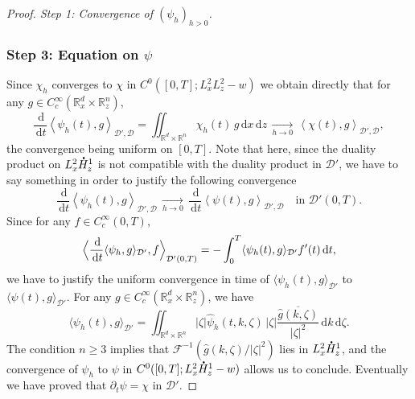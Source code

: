 \documentclass[JEP,XML,SOM,NoEqCountersInSection,NoFloatCountersInSection,Unicode,published]{cedram}
\let\hat\oldhat
\theoremstyle{definition}
\newcommand*{\overbigdot}[1]{%
\accentset{\mbox{\large\bfseries .}}{#1}}
\let\hat\widehat
\newcommand{\R}{\mathbb{R}}
\newcommand{\ud}{\, {\mathrm{d}}}
\begin{document}
\begin{proof}[Proof. Step 1: Convergence of $(\psi_{h})_{h>0}$]
\subsubsection*{Step 3: Equation on $\psi$} Since $\chi_{h}$ converges to $\chi$ in $C^{0}([0,T];L_{x}^{2}L_{z}^{2}-w)$ we obtain directly that for any $g\in C_{c}^{\infty}(\R_{x}^{d}\times\R_{z}^{n})$,
\[
\frac{\ud}{\ud t}\left\langle\psi_{h}(t),g\right\rangle_{\mathcal{D}',\mathcal{D}}=\iint_{\R^{d}\times\R^{n}}\chi_{h}(t)\,g\ud x\ud z\,\underset{h\to 0}{\to}\,\left\langle\chi(t),g\right\rangle_{\mathcal{D}',\mathcal{D}},
\]
the convergence being uniform on $[0,T]$. Note that here, since the duality product on $L_{x}^{2}\overbigdot{H}_{z}^{1}$ is not compatible with the duality product in $\mathcal{D}'$, we have to say something in order to justify the following convergence
\[
\frac{\ud}{\ud t}\left\langle\psi_{h}(t),g\right\rangle_{\mathcal{D}',\mathcal{D}}\,\underset{h\to 0}{\to}\,\frac{\ud}{\ud t}\left\langle\psi(t),g\right\rangle_{\mathcal{D}',\mathcal{D}}\quad\text{in }\mathcal{D}'(0,T).
\]
Since for any $f\in C_{c}^{\infty}(0,T)$,\vspace*{-3pt}
\[
\Bigl\langle\frac{\ud}{\ud t}\langle\psi_{h},g\rangle_{\mathcal{D}'},f\Bigr\rangle_{\mathcal{D'}(0,T)}=-\int_{0}^{T}\langle\psi_{h}(t),g\rangle_{\mathcal{D}'}f'(t)\ud t,
\]
we have to justify the uniform convergence in time of $\langle\psi_{h}(t),g\rangle_{\mathcal{D}'}$ to $\langle\psi(t),g\rangle_{\mathcal{D}'}$. For any $g\in C_{c}^{\infty}(\R_{x}^{d}\times\R_{z}^{n})$, we have
\[
\langle\psi_{h}(t),g\rangle_{\mathcal{D}'}=\iint_{\R^{d}\times\R^{n}}|\zeta|\hat{\psi}_{h}(t,k,\zeta)\,|\zeta|\overline{\frac{\hat{g}(k,\zeta)}{|\zeta|^{2}}}\ud k\ud\zeta.
\]
The condition $n\geq 3$ implies that $\mathcal{F}^{-1}(\hat{g}(k,\zeta)/|\zeta|^{2})$ lies in $L_{x}^{2}\overbigdot{H}_{z}^{1}$, and the convergence of $\psi_{h}$ to $\psi$ in $C^{0}([0,T];L_{x}^{2}\overbigdot{H}_{z}^{1}-w)$ allows us to conclude. Eventually we have proved that $\partial_{t}\psi=\chi$ in $\mathcal{D}'$.


\end{proof}
\end{document}
